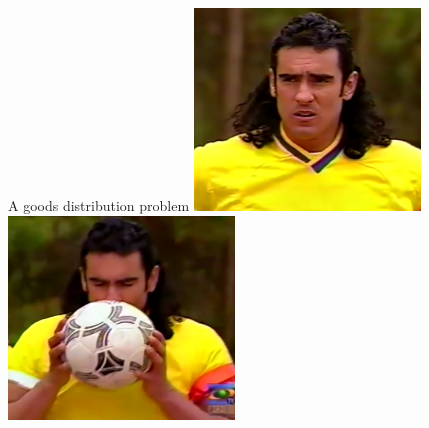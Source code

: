 


\frame{\titlepage}

\begin{frame}{A goods distribution problem}
	\includegraphics[width= 0.45\textwidth]{pedro_mirandoArco.png}
	\includegraphics[width= 0.45\textwidth]{pedro_balon.png}
\end{frame}

%


